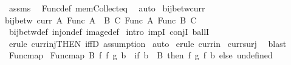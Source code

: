 \begin{isabellebody}
\ assms\ \isamarkupfalse%
\ Func{\isacharunderscore}{\kern0pt}def\ mem{\isacharunderscore}{\kern0pt}Collect{\isacharunderscore}{\kern0pt}eq\ \isamarkupfalse%
\ auto\isanewline
{}\isamarkupfalse%
%
\endisatagproof
{\isafoldproof}%
%
\isadelimproof
\isanewline
%
\endisadelimproof
\isanewline
{}\isamarkupfalse%
\ bij{\isacharunderscore}{\kern0pt}betw{\isacharunderscore}{\kern0pt}curr{\isacharcolon}{\kern0pt}\isanewline
{\isachardoublequoteopen}bij{\isacharunderscore}{\kern0pt}betw\ {\isacharparenleft}{\kern0pt}curr\ A{\isacharparenright}{\kern0pt}\ {\isacharparenleft}{\kern0pt}Func\ {\isacharparenleft}{\kern0pt}A\ {\isasymtimes}\ B{\isacharparenright}{\kern0pt}\ C{\isacharparenright}{\kern0pt}\ {\isacharparenleft}{\kern0pt}Func\ A\ {\isacharparenleft}{\kern0pt}Func\ B\ C{\isacharparenright}{\kern0pt}{\isacharparenright}{\kern0pt}{\isachardoublequoteclose}\isanewline
%
\isadelimproof
%
\endisadelimproof
%
\isatagproof
{}\isamarkupfalse%
\ bij{\isacharunderscore}{\kern0pt}betw{\isacharunderscore}{\kern0pt}def\ inj{\isacharunderscore}{\kern0pt}on{\isacharunderscore}{\kern0pt}def\ image{\isacharunderscore}{\kern0pt}def\isanewline
{}\isamarkupfalse%
\ {\isacharparenleft}{\kern0pt}intro\ impI\ conjI\ ballI{\isacharparenright}{\kern0pt}\isanewline
{}\isamarkupfalse%
\ {\isacharparenleft}{\kern0pt}erule\ curr{\isacharunderscore}{\kern0pt}inj{\isacharbrackleft}{\kern0pt}THEN\ iffD{}{\isacharbrackright}{\kern0pt}{\isacharcomma}{\kern0pt}\ assumption{\isacharplus}{\kern0pt}{\isacharparenright}{\kern0pt}\isanewline
{}\isamarkupfalse%
\ auto\isanewline
{}\isamarkupfalse%
\ {\isacharparenleft}{\kern0pt}erule\ curr{\isacharunderscore}{\kern0pt}in{\isacharparenright}{\kern0pt}\isanewline
{}\isamarkupfalse%
\ curr{\isacharunderscore}{\kern0pt}surj\ \isamarkupfalse%
\ blast%
\endisatagproof
{\isafoldproof}%
%
\isadelimproof
\isanewline
%
\endisadelimproof
\isanewline
{}\isamarkupfalse%
\ Func{\isacharunderscore}{\kern0pt}map\ \isanewline
{\isachardoublequoteopen}Func{\isacharunderscore}{\kern0pt}map\ B{}\ f{}\ f{}\ g\ b{}\ {\isasymequiv}\ if\ b{}\ {\isasymin}\ B{}\ then\ f{}\ {\isacharparenleft}{\kern0pt}g\ {\isacharparenleft}{\kern0pt}f{}\ b{}{\isacharparenright}{\kern0pt}{\isacharparenright}{\kern0pt}\ else\ undefined{\isachardoublequoteclose}\isanewline

\end{isabellebody}
